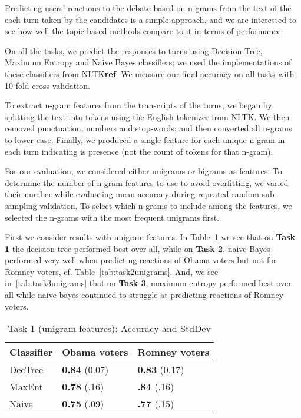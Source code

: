
Predicting users' reactions to the debate based on n-grams from the text of the each turn taken by the candidates is a simple approach, and we are interested to see how well the topic-based methods compare to it in terms of performance.

On all the tasks, we predict the responses to turns using Decision Tree, Maximum Entropy and Naive Bayes classifiers; we used the implementations of these classifiers from NLTK\textbf{ref}.  We measure our final accuracy on all tasks with 10-fold cross validation.  

To extract n-gram features from the transcripts of the turns, we began by splitting the text into tokens using the English tokenizer from NLTK.  We then removed punctuation, numbers and stop-words; and then converted all n-grams to lower-case.  Finally, we produced a single feature for each unique n-gram in each turn indicating is presence (not the count of tokens for that n-gram).  

For our evaluation, we considered either unigrams or bigrams as features.  To determine the number of n-gram features to use to avoid overfitting, we varied their number while evaluating mean accuracy during repeated random sub-sampling validation.  To select which n-grams to include among the features, we selected the n-grams with the most frequent unigrams first.

First we consider results with unigram features. In Table~\ref{tab:task1unigrams} we see that on \textbf{Task 1} the decision tree performed best over all, while on \textbf{Task 2}, naive Bayes performed very well when predicting reactions of Obama voters but not for Romney voters, cf. Table~\ref{tab:task2unigrams}.  And, we see in~\ref{tab:task3unigrams} that on \textbf{Task 3}, maximum entropy performed best over all while naive bayes continued to struggle at predicting reactions of Romney voters.

\begin{table}[H]
\begin{centering}
\begin{tabular}{ l | l | l }
Classifier & Obama voters & Romney voters \\
\hline
DecTree & \textbf{0.84} (0.07) &  \textbf{0.83} (0.17) \\
MaxEnt & \textbf{0.78} (.16) &  \textbf{.84} (.16) \\
Naive & \textbf{0.75} (.09) &  \textbf{.77} (.15) \\
\end{tabular}
\caption{Task 1 (unigram features): Accuracy and StdDev}
\label{tab:task1unigrams}
\end{centering}
\end{table}

